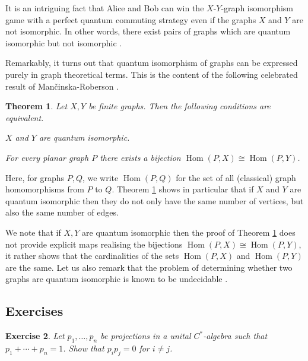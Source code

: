 \documentclass[a4paper]{amsart}
\DeclareMathOperator{\Hom}{Hom}
\newenvironment{bnum}
{\begin{list}{}
    {\setlength{\labelwidth}{15pt}
     \setlength{\leftmargin}{\labelwidth}
    }
}
{\end{list}}
\numberwithin{equation}{section}
\theoremstyle{change}
\newtheorem{theorem}{Theorem}[section]
\newtheorem{exercise}[theorem]{Exercise}
\begin{document}
It is an intriguing fact that Alice and Bob can win the $ X $-$ Y $-graph isomorphism game with a perfect quantum commuting strategy even if the graphs $ X $ and $ Y $ are not isomorphic. In other words, there exist pairs of graphs which are quantum isomorphic but not isomorphic  \cite{ATSERIAS_MANCINSKA_ROBERSON_SAMAL_SEVERINI_VARVITSIOTIS_quantumgraphisomorphism}. 

Remarkably, it turns out that quantum isomorphism of graphs can be expressed purely in graph theoretical terms. This is the content of the 
following celebrated result of Man\v{c}inska-Roberson \cite{MANCINSKA_ROBERSON_quantumisoplanar}.  

\begin{theorem} \label{qiMRchar} 
Let $ X, Y $ be finite graphs. Then the following conditions are equivalent. 
\begin{bnum}
\item[a)] $ X $ and $ Y $ are quantum isomorphic. 
\item[b)] For every planar graph $ P $ there exists a bijection $ \Hom(P, X) \cong \Hom(P,Y) $. 
\end{bnum}
\end{theorem}

Here, for graphs $ P, Q $, we write $ \Hom(P,Q) $ for the set of all (classical) graph homomorphisms from $ P $ to $ Q $. 
Theorem \ref{qiMRchar} shows in particular that if $ X $ and $ Y $ are quantum isomorphic then they do not only have the same number of vertices, 
but also the same number of edges.

We note that if $ X, Y $ are quantum isomorphic then the proof of Theorem  \ref{qiMRchar} does not provide explicit maps realising the bijections $ \Hom(P, X) \cong \Hom(P,Y) $, it rather shows that the cardinalities of the sets $ \Hom(P, X) $ and $ \Hom(P, Y) $ are the same. Let us also remark that the problem of determining whether two graphs are quantum isomorphic is known to be undecidable \cite{ATSERIAS_MANCINSKA_ROBERSON_SAMAL_SEVERINI_VARVITSIOTIS_quantumgraphisomorphism}. 

\subsection{Exercises}

\begin{exercise} \label{exI1}
Let $ p_1, \dots, p_n $ be projections in a unital $ C^* $-algebra such that $ p_1 + \cdots + p_n = 1 $. Show that $ p_i p_j = 0 $ for $ i \neq j $. 
\end{exercise} 
\end{document}
